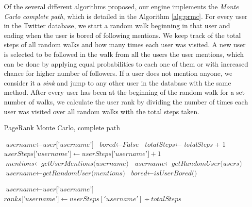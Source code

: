 Of the several different algorithms proposed, our engine implements the
\emph{Monte Carlo complete path}, which is detailed in the Algorithm
\ref{alg:prmc}. For every user in the Twitter database, we start a random walk
beginning in that user and ending when the user is bored of following mentions.
We keep track of the total steps of all random walks and how many times each
user was visited. A new user is selected to be followed in the walk from all the
users the user mentions, which can be done by applying equal probabilities to
each one of them or with increased chance for higher number of followers. If a
user does not mention anyone, we consider it a \emph{sink} and jump to any other
user in the database with the same method. After every user has been at the
beginning of the random walk for a set number of walks, we calculate the user
rank by dividing the number of times each user was visited over all random walks
with the total steps taken.

\begin{algorithm}
\caption{PageRank Monte Carlo, complete path}\label{alg:prmc}
\begin{algorithmic}[1]
	\State $\textit{username} \gets \textit{user['username']}$
    \State $\textit{bored} \gets \textit{False}$
		\State $\textit{totalSteps} \gets $\textit{totalSteps} + 1
        \State $\textit{userSteps['username']} \gets \textit{userSteps['username']} + 1$
        \State $\textit{mentions} \gets \textit{getUserMentions(username)}$
                \State $\textit{username} \gets \textit{getRandomUser(users)}$
        \Else
     		\State $\textit{username} \gets \textit{getRandomUser(mentions)}$
        \EndIf
        \State $\textit{bored} \gets \textit{isUserBored()}$
    \EndWhile
\EndFor
\EndFor

	\State $\textit{username} \gets \textit{user['username']}$
	\State $\textit{ranks['username']} \gets userSteps['username'] \div totalSteps $
\EndFor

\State {}

\EndProcedure
\end{algorithmic}
\end{algorithm}
